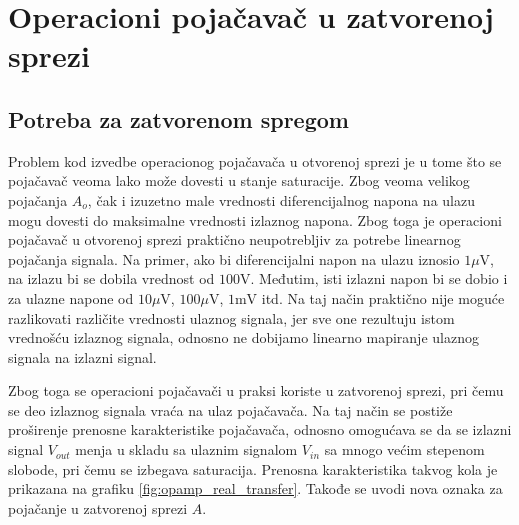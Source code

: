 \section{Operacioni pojačavač u zatvorenoj sprezi}

\subsection{Potreba za zatvorenom spregom}

{Problem kod izvedbe operacionog pojačavača u otvorenoj sprezi je u tome što se pojačavač veoma lako može dovesti u stanje saturacije. Zbog veoma velikog pojačanja $A_{o}$, čak i izuzetno male vrednosti diferencijalnog napona na ulazu mogu dovesti do maksimalne vrednosti izlaznog napona. Zbog toga je operacioni pojačavač u otvorenoj sprezi praktično neupotrebljiv za potrebe linearnog pojačanja signala. Na primer, ako bi diferencijalni napon na ulazu iznosio $1\mu\mathrm{V}$, na izlazu bi se dobila vrednost od $100\mathrm{V}$. Međutim, isti izlazni napon bi se dobio i za ulazne napone od $10\mu\mathrm{V}$, $100\mu\mathrm{V}$, $1\mathrm{mV}$ itd. Na taj način praktično nije moguće razlikovati različite vrednosti ulaznog signala, jer sve one rezultuju istom vrednošću izlaznog signala, odnosno ne dobijamo linearno mapiranje ulaznog signala na izlazni signal.}

{Zbog toga se operacioni pojačavači u praksi koriste u zatvorenoj sprezi, pri čemu se deo izlaznog signala vraća na ulaz pojačavača. Na taj način se postiže proširenje prenosne karakteristike pojačavača, odnosno omogućava se da se izlazni signal $V_{out}$ menja u skladu sa ulaznim signalom $V_{in}$ sa mnogo većim stepenom slobode, pri čemu se izbegava saturacija. Prenosna karakteristika takvog kola je prikazana na grafiku \ref{fig:opamp_real_transfer}. Takođe se uvodi nova oznaka za pojačanje u zatvorenoj sprezi $A$.}

